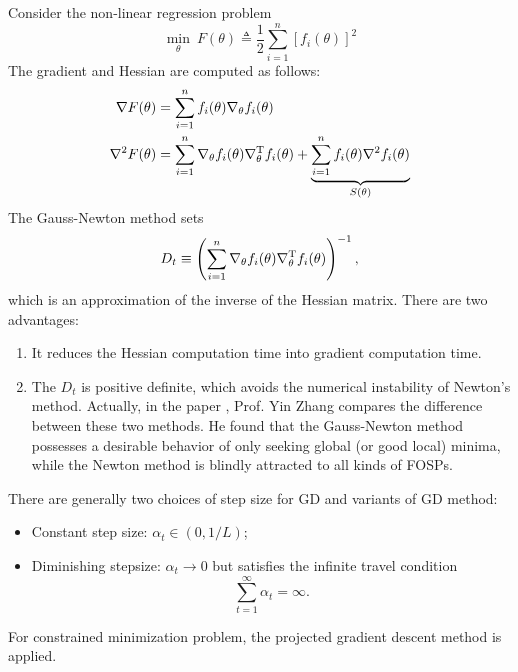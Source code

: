 \begin{example}
Consider the non-linear regression problem
\[
\min_{\theta}~F(\theta)\triangleq \frac{1}{2}\sum_{i=1}^n[f_i(\theta)]^2
\]
The gradient and Hessian are computed as follows:
\begin{align*}
\nabla F(\theta) &= \sum_{i=1}^nf_i(\theta)\nabla_{\theta}f_i(\theta)\\
\nabla^2F(\theta)&=\sum_{i=1}^n\nabla_{\theta}f_i(\theta)\nabla^{\mathrm T}_{\theta}f_i(\theta)
+\underbrace{\sum_{i=1}^nf_i(\theta)\nabla^2f_i(\theta)}_{S(\theta)}
\end{align*}
The Gauss-Newton method sets 
\[
D_t\equiv\left(\sum_{i=1}^n\nabla_{\theta}f_i(\theta)\nabla^{\mathrm T}_{\theta}f_i(\theta)\right)^{-1},
\]
 which is an approximation of the inverse of the Hessian matrix.
 There are two advantages:
\begin{enumerate}
\item
It reduces the Hessian computation time into gradient computation time.
\item
The $D_t$ is positive definite, which avoids the numerical instability of Newton's method.
Actually, in the paper \citep{Zhang2000}, Prof. Yin Zhang compares the difference between these two methods. He found that the Gauss-Newton method possesses a desirable behavior of only seeking global (or good local) minima, while the Newton method is blindly attracted to all kinds of FOSPs. 


\end{enumerate}

\end{example}


\begin{remark}
There are generally two choices of step size for GD and variants of GD method:
\begin{itemize}
\item
Constant step size: $\alpha_t \in(0,1/L)$;
\item
Diminishing stepsize: $\alpha_t\to0$ but satisfies the infinite travel condition
\[
\sum_{t=1}^\infty\alpha_t=\infty.
\]
\end{itemize}
For constrained minimization problem, the projected gradient descent method is applied.
\end{remark}

